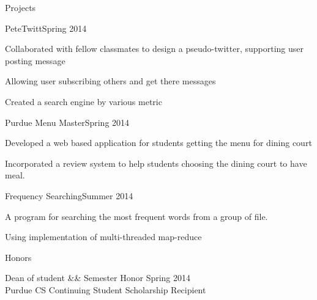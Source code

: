 \documentclass{resume} %
\begin{document}

\begin{rSection}{Projects}
\begin{rSubsection}{PeteTwitt}{Spring 2014}{}{}
\item Collaborated with fellow classmates to design a pseudo-twitter, supporting user posting message
\item Allowing user subscribing others and get there messages
\item Created a search engine by various metric
\end{rSubsection}

\begin{rSubsection}{Purdue Menu Master}{Spring 2014}{}{}
\item Developed a web based application for students getting the menu for dining court
\item Incorporated a review system to help students choosing the dining court to have meal.
\end{rSubsection}

\begin{rSubsection}{Frequency Searching}{Summer 2014}{}{}
\item A program for searching the most frequent words from a group of file.
\item Using implementation of multi-threaded map-reduce
\end{rSubsection}


\end{rSection}

\begin{rSection}{Honors}{}{}


Dean of student \&\& Semester Honor  \hspace{100mm} Spring 2014\\ 
Purdue CS Continuing Student Scholarship Recipient 


\end{rSection}

\end{document}
